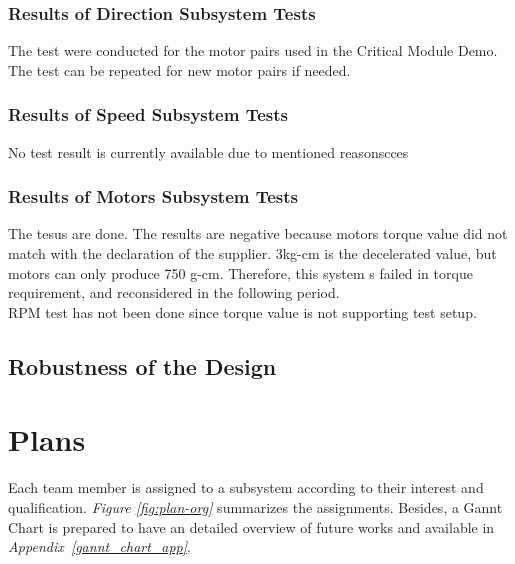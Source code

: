 \documentclass[a4paper,12pt]{article}
\begin{document}
	
	
	
	
	
	
	\subsubsection*{Results of Direction Subsystem Tests}
		
		The test were conducted for the motor pairs used in the Critical Module Demo. The test can be repeated for new motor pairs if needed.
	
	
	
	
	
	
	
	
	
	
	\subsubsection*{Results of Speed Subsystem Tests}
	No test result is currently available due to mentioned reasonscces	
	
	 
	
	 
	
	
	
\subsubsection*{Results of Motors Subsystem Tests}
	
The tesus are done. The results are negative because motors torque value did not match with the declaration of the supplier. 3kg-cm is the decelerated value, but motors can only produce 750 g-cm. Therefore, this system s failed in torque requirement, and reconsidered in the following period. \\
		
	
	RPM test has not been done since torque value is not supporting test setup.
	
	
	 
	 
	
	
	
	\subsection{Robustness of the Design}
	
	
	
	
	
	
	
	
	\section{Plans}
	Each team member is assigned to a subsystem according to their interest and qualification. \textit{Figure \ref{fig:plan-org}} summarizes the assignments. Besides, a Gannt Chart is prepared to have an detailed overview of future works and available in \textit{Appendix~\ref{gannt_chart_app}}.
	
\end{document}
